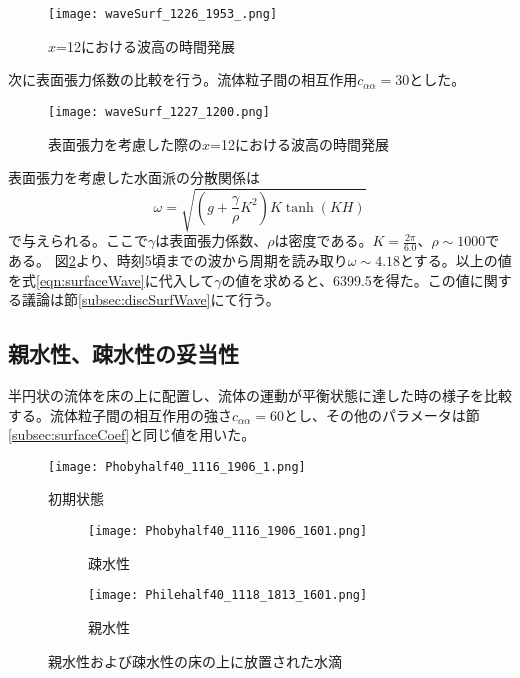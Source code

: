 \documentclass[]{jsarticle}
\begin{document}
\begin{figure}[H]
  \centering
  \texttt{[image: waveSurf\_1226\_1953\_.png]}
  \caption{$x$=12における波高の時間発展}
  \label{fig:waveSurfEvol}
\end{figure}


次に表面張力係数の比較を行う。流体粒子間の相互作用$c_{\alpha\alpha}=30$とした。
\begin{figure}[H]
  \centering
  \texttt{[image: waveSurf\_1227\_1200.png]}
  \caption{表面張力を考慮した際の$x$=12における波高の時間発展}
  \label{fig:waveSurfEvolwithSurfTension}
\end{figure}

表面張力を考慮した水面派の分散関係は
\begin{equation}
  \omega=\sqrt{\left(g+\frac{\gamma}{\rho}K^2 \right)K \tanh (KH)}
  \label{eqn:surfaceWave}
\end{equation}
で与えられる\cite{tatsumiKiso}。ここで$\gamma$は表面張力係数、$\rho$は密度である。$K=\frac{2\pi}{6.0}$、$\rho\sim1000$である。 図\ref{fig:waveSurfEvolwithSurfTension}より、時刻5頃までの波から周期を読み取り$\omega\sim4.18$とする。以上の値を式\ref{eqn:surfaceWave}に代入して$\gamma$の値を求めると、6399.5を得た。この値に関する議論は節\ref{subsec:discSurfWave}にて行う。


\subsection{親水性、疎水性の妥当性}
\label{subsec:validity}

半円状の流体を床の上に配置し、流体の運動が平衡状態に達した時の様子を比較する。流体粒子間の相互作用の強さ$c_{\alpha\alpha}=60$とし、その他のパラメータは節\ref{subsec:surfaceCoef}と同じ値を用いた。
\begin{figure}[H]
  \centering
  \texttt{[image: Phobyhalf40\_1116\_1906\_1.png]}
  \caption{初期状態}
  \label{fig:contactInitial}
\end{figure}

\begin{figure}[H]
  \centering
  \begin{subfigure}{0.8\columnwidth}
    \centering
    \texttt{[image: Phobyhalf40\_1116\_1906\_1601.png]}
    \caption{疎水性}
    \label{fig:PhobyDrop}
  \end{subfigure}
  \begin{subfigure}{0.8\columnwidth}
    \centering
    \texttt{[image: Philehalf40\_1118\_1813\_1601.png]}
    \caption{親水性}
    \label{fig:PhileDrop}
  \end{subfigure}
  \caption{親水性および疎水性の床の上に放置された水滴}
  \label{fig:contactAngles}
\end{figure}
\end{document}

